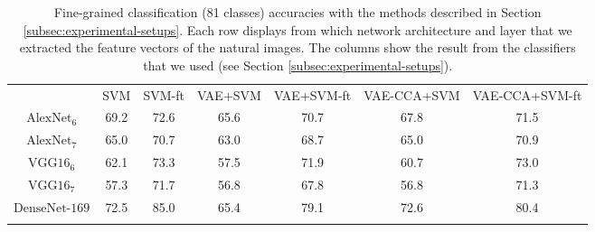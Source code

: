 \renewcommand{\arraystretch}{1.2}
\begin{table}[t]
    \centering
    \caption{ Fine-grained classification (81 classes) accuracies with the methods described in Section \ref{subsec:experimental-setups}. Each row displays from which network architecture and layer that we extracted the feature vectors of the natural images. The columns show the result from the classifiers that we used (see Section \ref{subsec:experimental-setups}). }
    \vspace{2mm}
    \begin{tabular}{c | c c | c c | c c}
        \hline
        \Xhline{3\arrayrulewidth}
        & SVM & SVM-ft & VAE+SVM & VAE+SVM-ft & VAE-CCA+SVM & VAE-CCA+SVM-ft  \\
        \Xhline{3\arrayrulewidth}
        \rowcolor{Gray}
         $\text{AlexNet}_{6}$  &  69.2 & 72.6 & 65.6 & 70.7 & 67.8	& 71.5 \\
         $\text{AlexNet}_{7}$ &  65.0 & 70.7 & 63.0 & 68.7 & 65.0 & 70.9 \\
        \rowcolor{Gray}
         $\text{VGG16}_{6}$ &  62.1	& 73.3 & 57.5 & 71.9 & 60.7 & 73.0 \\
         $\text{VGG16}_{7}$ & 57.3	& 71.7 & 56.8 & 67.8 & 56.8 & 71.3 \\
        \rowcolor{Gray}
         $\text{DenseNet-169}$ & 72.5 & 85.0 & 65.4 & 79.1 & 72.6 & 80.4 \\
        \Xhline{3\arrayrulewidth}
    \end{tabular}
    \label{tab:results-fine-grained}
\end{table}

\renewcommand{\arraystretch}{1.2}
\begin{table}[t]
    \centering
    \caption{Coarse-grained classification (46 classes) accuracies with an SVM for the methods described in Section \ref{subsec:experimental-setups} that uses off-the-shelf feature representations. Each row displays from network architecture and layer that we extracted the feature vectors of the natural images and the columns show the result for the classification methods. }
    \vspace{2mm}
    \label{tab:results-coarse-grained}
\end{table}

